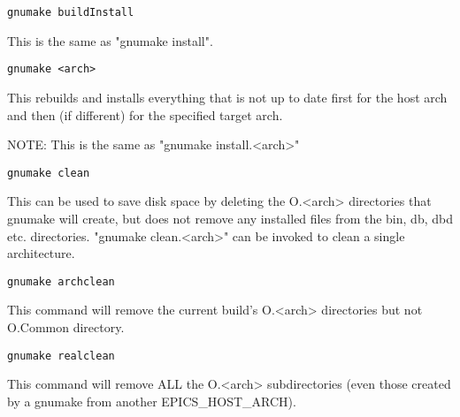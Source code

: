 \begin{description}
\end{description}\begin{verbatim}gnumake buildInstall
\end{verbatim}\begin{description}\item This is the same as "gnumake install".

\item 

\end{description}\begin{verbatim}gnumake <arch>
\end{verbatim}\begin{description}\item This rebuilds and installs everything that is not up to date first for the host arch and then (if different) for the 
specified target arch.

\item NOTE: This is the same as "gnumake install.\textless{}arch\textgreater{}"

\item 

\end{description}\begin{verbatim}gnumake clean
\end{verbatim}\begin{description}\item This can be used to save disk space by deleting the O.\textless{}arch\textgreater{} directories that gnumake will create, but does not 
remove any installed files from the bin, db, dbd etc. directories. "gnumake clean.\textless{}arch\textgreater{}" can be invoked to clean a 
single architecture.

\item 

\end{description}\begin{verbatim}gnumake archclean
\end{verbatim}\begin{description}\item This command will remove the current build's O.\textless{}arch\textgreater{} directories but not O.Common directory.

\item 

\end{description}\begin{verbatim}gnumake realclean
\end{verbatim}\begin{description}\item This command will remove ALL the O.\textless{}arch\textgreater{} subdirectories (even those created by a gnumake from another 
EPICS\_HOST\_ARCH).


\end{description}
